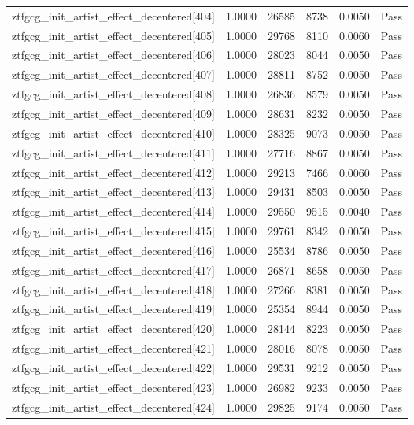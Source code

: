 \begin{table}[htbp]
\begin{tabular}{llrrll}
ztfgcg\_init\_artist\_effect\_decentered[404] & 1.0000 & 26585 & 8738 & 0.0050 & Pass \\
ztfgcg\_init\_artist\_effect\_decentered[405] & 1.0000 & 29768 & 8110 & 0.0060 & Pass \\
ztfgcg\_init\_artist\_effect\_decentered[406] & 1.0000 & 28023 & 8044 & 0.0050 & Pass \\
ztfgcg\_init\_artist\_effect\_decentered[407] & 1.0000 & 28811 & 8752 & 0.0050 & Pass \\
ztfgcg\_init\_artist\_effect\_decentered[408] & 1.0000 & 26836 & 8579 & 0.0050 & Pass \\
ztfgcg\_init\_artist\_effect\_decentered[409] & 1.0000 & 28631 & 8232 & 0.0050 & Pass \\
ztfgcg\_init\_artist\_effect\_decentered[410] & 1.0000 & 28325 & 9073 & 0.0050 & Pass \\
ztfgcg\_init\_artist\_effect\_decentered[411] & 1.0000 & 27716 & 8867 & 0.0050 & Pass \\
ztfgcg\_init\_artist\_effect\_decentered[412] & 1.0000 & 29213 & 7466 & 0.0060 & Pass \\
ztfgcg\_init\_artist\_effect\_decentered[413] & 1.0000 & 29431 & 8503 & 0.0050 & Pass \\
ztfgcg\_init\_artist\_effect\_decentered[414] & 1.0000 & 29550 & 9515 & 0.0040 & Pass \\
ztfgcg\_init\_artist\_effect\_decentered[415] & 1.0000 & 29761 & 8342 & 0.0050 & Pass \\
ztfgcg\_init\_artist\_effect\_decentered[416] & 1.0000 & 25534 & 8786 & 0.0050 & Pass \\
ztfgcg\_init\_artist\_effect\_decentered[417] & 1.0000 & 26871 & 8658 & 0.0050 & Pass \\
ztfgcg\_init\_artist\_effect\_decentered[418] & 1.0000 & 27266 & 8381 & 0.0050 & Pass \\
ztfgcg\_init\_artist\_effect\_decentered[419] & 1.0000 & 25354 & 8944 & 0.0050 & Pass \\
ztfgcg\_init\_artist\_effect\_decentered[420] & 1.0000 & 28144 & 8223 & 0.0050 & Pass \\
ztfgcg\_init\_artist\_effect\_decentered[421] & 1.0000 & 28016 & 8078 & 0.0050 & Pass \\
ztfgcg\_init\_artist\_effect\_decentered[422] & 1.0000 & 29531 & 9212 & 0.0050 & Pass \\
ztfgcg\_init\_artist\_effect\_decentered[423] & 1.0000 & 26982 & 9233 & 0.0050 & Pass \\
ztfgcg\_init\_artist\_effect\_decentered[424] & 1.0000 & 29825 & 9174 & 0.0050 & Pass \\

\end{tabular}
\end{table}
